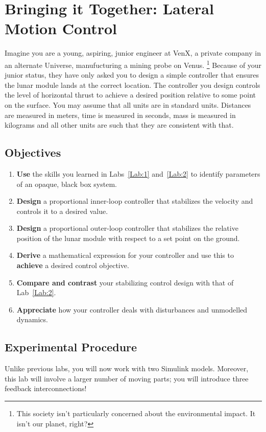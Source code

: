 \chapter{Bringing it Together: Lateral Motion Control}\label{Lab:3}
Imagine you are a young, aspiring, junior engineer at VenX, a private company in an alternate Universe, manufucturing a mining probe on Venus.
\footnote{This society isn't particularly concerned about the environmental impact. It isn't our planet, right?}
Because of your junior status, they have only asked you to design a simple controller that ensures the lunar module lands at the correct location.
The controller you design controls the level of horizontal thrust to achieve a desired position relative to some point on the surface.
You may assume that all units are in standard units.
Distances are measured in meters, time is measured in seconds, mass is measured in kilograms and all other units are such that they are consistent with that.

\section{Objectives}
\begin{enumerate}[label=(\arabic*)]
  \item{
    \textbf{Use} the skills you learned in Labs~\ref{Lab:1} and~\ref{Lab:2}
    to identify parameters of an opaque, black box system.
  }
  \item{
    \textbf{Design} a proportional inner-loop controller that stabilizes the velocity and controls it to a desired value.
  }
  \item{
    \textbf{Design} a proportional outer-loop controller that stabilizes the relative position of the lunar module with respect to a set point on the ground.
  }
  \item{
    \textbf{Derive} a mathematical expression for your controller and use this to \textbf{achieve} a desired control objective.
  }
  \item{
    \textbf{Compare and contrast} your stabilizing control design with that of Lab~\ref{Lab:2}.
  }
  \item{
    \textbf{Appreciate} how your controller deals with disturbances and unmodelled dynamics.
  }
\end{enumerate}

\section{Experimental Procedure}\label{Lab:3:Experiment}
Unlike previous labs, you will now work with two Simulink models.
Moreover, this lab will involve a larger number of moving parts;
you will introduce three feedback interconnections!

